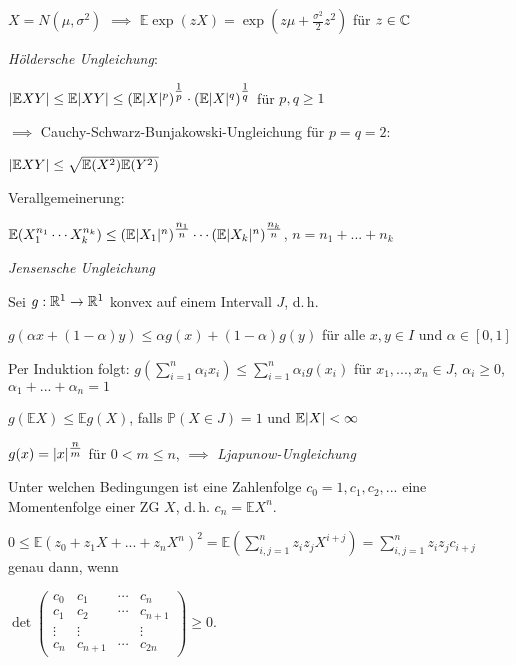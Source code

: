 \documentclass{cheat-sheet}
\renewcommand{\P}{\mathbb{P}} %
\newcommand{\E}{\mathbb{E}} %
\begin{document}
$X = N(\mu, \sigma^2)$ $\implies$ $\E \exp(z X) = \exp\left( z\mu + \tfrac{\sigma^2}{2} z^2 \right)$ für $z \in \mathbb{C}$

\emph{Höldersche Ungleichung}:

$\abs{\E X Y} \leq \E \abs{XY} \leq (\E \abs{X}^p)^{\tfrac{1}{p}} \cdot (\E \abs{X}^q)^{\tfrac{1}{q}}$ für $p, q \geq 1$

$\implies$ Cauchy-Schwarz-Bunjakowski-Ungleichung für $p = q = 2$:

$\abs{\E XY} \leq \sqrt{ \E (X^2) \E(Y^2) }$

Verallgemeinerung:

$\E(X_1^{n_1} \cdots X_k^{n_k}) \leq (\E \abs{X_1}^n)^{\tfrac{n_1}{n}} \cdots (\E \abs{X_k}^n)^{\tfrac{n_k}{n}}$, $n = n_1 + ... + n_k$

\emph{Jensensche Ungleichung}

Sei $g : \mathbb{R}^1 \to \mathbb{R}^1$ konvex auf einem Intervall $J$, d.\,h.

$g(\alpha x + (1-\alpha)y) \leq \alpha g(x) + (1-\alpha) g(y)$ für alle $x, y \in I$ und $\alpha \in [0,1]$

Per Induktion folgt: $g(\sum_{i=1}^n \alpha_i x_i) \leq \sum_{i=1}^n \alpha_i g(x_i)$ für $x_1, ..., x_n \in J$, $\alpha_i \geq 0$, $\alpha_1 + ... + \alpha_n = 1$

\begin{satz}
  $g(\E X) \leq \E g(X)$, falls $\P(X \in J) = 1$ und $\E \abs{X} < \infty$
\end{satz}


$g(x) = \lvert x\rvert^{\tfrac{n}{m}}$ für $0 < m \leq n$, $\implies$ \emph{Ljapunow-Ungleichung}

\begin{problem}[Momentenproblem]
  Unter welchen Bedingungen ist eine Zahlenfolge $c_0 = 1, c_1, c_2, ...$ eine Momentenfolge einer ZG $X$, d.\,h. $c_n = \E X^n$.
\end{problem}

\begin{antwort}
  $0 \leq \E(z_0 + z_1 X + ... + z_n X^n)^2 = \E(\sum_{i,j=1}^n z_i z_j X^{i+j}) = \sum_{i,j=1}^n z_i z_j c_{i+j}$ genau dann, wenn

  $\det \begin{pmatrix} c_0 & c_1 & \cdots & c_n \\ c_1 & c_2 & \cdots & c_{n+1} \\ \vdots & \vdots & & \vdots \\ c_n & c_{n+1} & \cdots & c_{2n} \end{pmatrix} \geq 0$.
\end{antwort}
\end{document}
